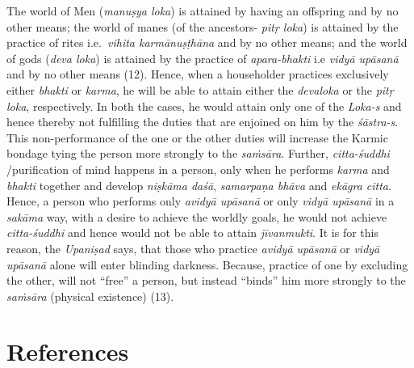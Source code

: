 The world of Men (\emph{manuṣya loka}) is attained by having an offspring and by no other means; the world of manes (of the ancestors- \emph{pitṛ loka}) is attained by the practice of rites i.e.\ \emph{vihita karmānuṣṭhāna} and by no other means; and the world of gods (\emph{deva loka}) is attained by the practice of \emph{apara-bhakti} i.e \emph{vidyā upāsanā} and by no other means (12). Hence, when a householder practices exclusively either \emph{bhakti} or \emph{karma}, he will be able to attain either the \emph{devaloka} or the \emph{pitṛ loka}, respectively. In both the cases, he would attain only one of the \emph{Loka-s} and hence thereby not fulfilling the duties that are enjoined on him by the \emph{śāstra-s}. This non-performance of the one or the other duties will increase the Karmic bondage tying the person more strongly to the \emph{saṁsāra}. Further, \emph{citta-śuddhi} /purification of mind happens in a person, only when he performs \emph{karma} and \emph{bhakti} together and develop \emph{niṣkāma daśā}, \emph{samarpaṇa bhāva} and \emph{ekāgra citta}. Hence, a person who performs only \emph{avidyā upāsanā} or only \emph{vidyā upāsanā} in a \emph{sakāma} way, with a desire to achieve the worldly goals, he would not achieve \emph{citta-śuddhi} and hence would not be able to attain \emph{jīvanmukti}. It is for this reason, the \emph{Upaniṣad} says, that those who practice \emph{avidyā upāsanā} or \emph{vidyā upāsanā} alone will enter blinding darkness. Because, practice of one by excluding the other, will not ``free'' a person, but instead ``binds'' him more strongly to the \emph{saṁsāra} (physical existence) (13).

\section*{References}

